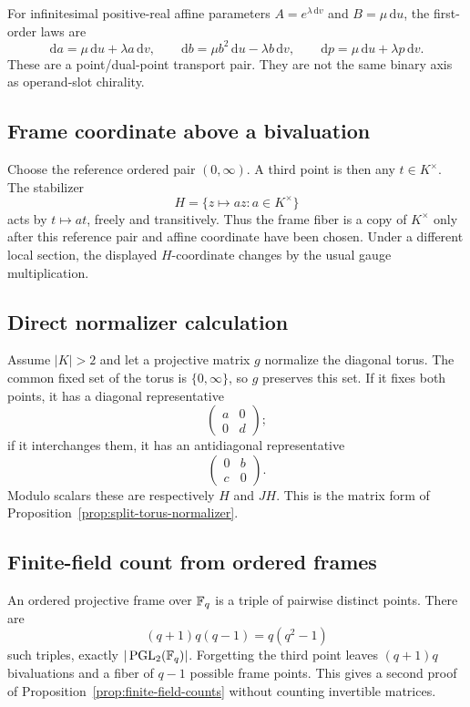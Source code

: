 For infinitesimal positive-real affine parameters
$A=e^{\lambda\,\mathrm{d}v}$ and $B=\mu\,\mathrm{d}u$, the first-order laws are
\[
  \mathrm{d}a=\mu\,\mathrm{d}u+\lambda a\,\mathrm{d}v,
  \qquad
  \mathrm{d}b=\mu b^2\,\mathrm{d}u-\lambda b\,\mathrm{d}v,
  \qquad
  \mathrm{d}p=\mu\,\mathrm{d}u+\lambda p\,\mathrm{d}v.
\]
These are a point/dual-point transport pair.  They are not the same binary axis
as operand-slot chirality.

\subsection{Frame coordinate above a bivaluation}

Choose the reference ordered pair $(0,\infty)$.  A third point is then any
$t\in K^\times$.  The stabilizer
\[
  H=\{z\mapsto az:a\in K^\times\}
\]
acts by $t\mapsto at$, freely and transitively.  Thus the frame fiber is a copy
of $K^\times$ only after this reference pair and affine coordinate have been
chosen.  Under a different local section, the displayed $H$-coordinate changes
by the usual gauge multiplication.

\subsection{Direct normalizer calculation}

Assume $|K|>2$ and let a projective matrix $g$ normalize the diagonal torus.
The common fixed set of the torus is $\{0,\infty\}$, so $g$ preserves this set.
If it fixes both points, it has a diagonal representative
\[
  \begin{pmatrix}a&0\\0&d\end{pmatrix};
\]
if it interchanges them, it has an antidiagonal representative
\[
  \begin{pmatrix}0&b\\c&0\end{pmatrix}.
\]
Modulo scalars these are respectively $H$ and $JH$.  This is the matrix form of
Proposition~\ref{prop:split-torus-normalizer}.

\subsection{Finite-field count from ordered frames}

An ordered projective frame over $\mathbb{F}_q$ is a triple of pairwise distinct points.
There are
\[
  (q+1)q(q-1)=q(q^2-1)
\]
such triples, exactly $|\operatorname{PGL}_2(\mathbb{F}_q)|$.  Forgetting the third point leaves
$(q+1)q$ bivaluations and a fiber of $q-1$ possible frame points.  This gives a
second proof of Proposition~\ref{prop:finite-field-counts} without counting
invertible matrices.
